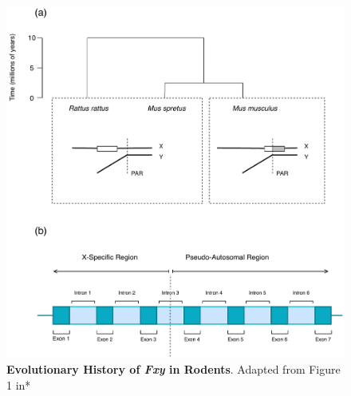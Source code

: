 \begin{figure}[!ht]
\centering
\includegraphics[width=\textwidth]{figures/diagrams/Fxy.pdf}
\caption{\textbf{Evolutionary History of \textit{Fxy} in Rodents}. Adapted from Figure 1 in* \cite{Galtier2007AdaptationEvolution}}
\label{fig:Fxy}
\end{figure}